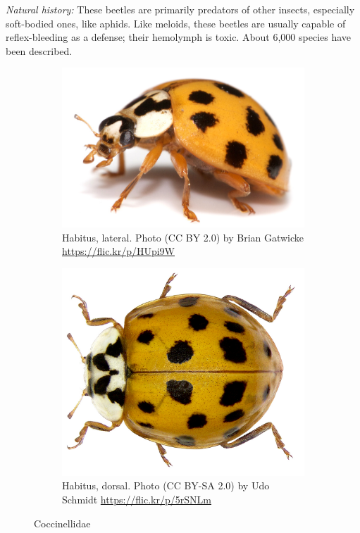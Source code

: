 \documentclass[letterpaper, 11pt]{article}
\begin{document}
\noindent{}\textit{Natural history:} These beetles are primarily predators of other insects, especially soft-bodied ones, like aphids. Like meloids, these beetles are usually capable of reflex-bleeding as a defense; their hemolymph is toxic. About 6,000 species have been described.

\begin{figure}[ht!]
  \centering
\begin{subfigure}[ht!]{0.42\textwidth}
    \includegraphics[width=\textwidth]{CoccinellidLateral}
  \caption{Habitus, lateral. Photo (CC BY 2.0) by Brian Gatwicke \url{https://flic.kr/p/HUpi9W}}
  \label{fig:coccinellid1}
\end{subfigure}
    \qquad
\begin{subfigure}[ht!]{0.39\textwidth}
    \includegraphics[width=\textwidth]{CoccinellidHabitus}
  \caption{Habitus, dorsal. Photo (CC BY-SA 2.0) by Udo Schmidt \url{https://flic.kr/p/5rSNLm}}
  \label{fig:coccinellid2}
\end{subfigure}
    \caption{Coccinellidae}\label{fig:coccinellids}
\end{figure}
\end{document}
